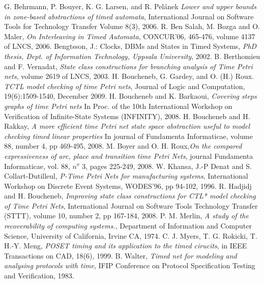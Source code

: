 \documentclass[submission,copyright,creativecommons]{eptcs}
\numberwithin{equation}{section}
\begin{document}
\begin{thebibliography}{10}\label{bibliography}
 G. Behrmann, P. Bouyer, K. G. Larsen, and R. Pel{\'a}nek \emph{Lower and
upper bounds in zone-based abstractions of timed automata},
International Journal on Software Tools for Technology Transfer
Volume 8(3), 2006.
 R. Ben Salah, M. Bozga and O. Maler, \emph{On Interleaving in Timed Automata}, CONCUR'06, 465-476,
volume 4137 of LNCS, 2006.
  Bengtsson, J.: Clocks, DBMs and States in Timed Systems, \emph{PhD
thesis, Dept. of Information Technology, Uppsala University},
2002.
 B. Berthomieu and F. Vernadat, \emph{State class constructions for branching analysis of Time Petri nets},
volume 2619 of LNCS, 2003.
 H. Boucheneb, G. Gardey, and O.
(H.) Roux. \emph{TCTL model checking of time Petri nets}, Journal
of Logic and Computation, 19(6):1509-1540, December 2009.
 H. Boucheneb and K. Barkaoui,
\emph{Covering steps graphs of time Petri nets} In Proc. of the
10th International Workshop on Verification of Infinite-State
Systems (INFINITY), 2008.
 H. Boucheneb and H. Rakkay, \emph{A more efficient time Petri net state space abstraction useful to model checking timed linear
properties} In journal of Fundamenta Informaticae, volume 88,
number 4, pp 469-495, 2008.
 M. Boyer and O. H. Roux,\emph{On the compared expressiveness of arc, place and transition time {Petri} Nets}, journal Fundamenta Informaticae, vol. 88, $n^o$ 3, pages 225-249, 2008.
 W. Khansa,  J.-P Denat and  S. Collart-Dutilleul,
 \emph{P-Time {P}etri Nets for manufacturing systems}, International Workshop on Discrete Event Systems, WODES'96, pp 94-102, 1996.
 R. Hadjidj and H. Boucheneb, \emph{Improving state class constructions for {CTL*} model checking of
Time Petri Nets}, International Journal on Software Tools
Technology Transfer (STTT), volume 10, number 2, pp 167-184, 2008.
 P. M. Merlin, \emph{A study of the recoverability of computing systems.}, Department of Information and Computer Science, University of California, Irvine CA, 1974.
 C. J. Myers, T. G. Rokicki, T. H.-Y. Meng, \emph{POSET timing and its application to the timed cirucits}, in IEEE Transactions on CAD, 18(6), 1999.
 B. Walter, \emph{Timed net for modeling and analysing protocols with time},
IFIP Conference on Protocol Specification Testing and Verification, 1983.
\end{thebibliography}
\end{document}
